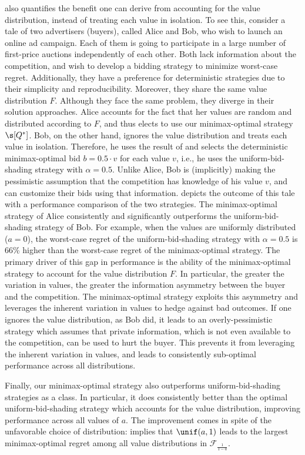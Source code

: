  also quantifies the benefit one can derive from accounting for the value distribution, instead of treating each value in isolation. To see this, consider a tale of two advertisers (buyers), called Alice and Bob, who wish to launch an online ad campaign. Each of them is going to participate in a large number of first-price auctions independently of each other. Both lack information about the competition, and wish to develop a bidding strategy to minimize worst-case regret. Additionally, they have a preference for deterministic strategies due to their simplicity and reproducibility. Moreover, they share the same value distribution $F$. Although they face the same problem, they diverge in their solution approaches. Alice accounts for the fact that her values are random and distributed according to $F$, and thus elects to use our minimax-optimal strategy $\s[Q^*]$. Bob, on the other hand, ignores the value distribution and treats each value in isolation. Therefore, he uses the result of \citet{kasberger2023robust} and selects the deterministic minimax-optimal bid $b = 0.5 \cdot v$ for each value $v$, i.e., he uses the uniform-bid-shading strategy with $\alpha = 0.5$. Unlike Alice, Bob is (implicitly) making the pessimistic assumption that the competition has knowledge of his value $v$, and can customize their bids using that information.  depicts the outcome of this tale with a performance comparison of the two strategies. The minimax-optimal strategy of Alice consistently and significantly outperforms the uniform-bid-shading strategy of Bob. For example, when the values are uniformly distributed ($a = 0$), the worst-case regret of the uniform-bid-shading strategy with $\alpha = 0.5$ is 66\% higher than the worst-case regret of the minimax-optimal strategy. The primary driver of this gap in performance is the ability of the minimax-optimal strategy to account for the value distribution $F$. In particular, the greater the variation in values, the greater the information asymmetry between the buyer and the competition. The minimax-optimal strategy exploits this asymmetry and leverages the inherent variation in values to hedge against bad outcomes. If one ignores the value distribution, as Bob did, it leads to an overly-pessimistic strategy which assumes that private information, which is not even available to the competition, can be used to hurt the buyer. This prevents it from leveraging the inherent variation in values, and leads to consistently sub-optimal performance across all distributions.

Finally, our minimax-optimal strategy also outperforms uniform-bid-shading strategies as a class. In particular, it does consistently better than the optimal uniform-bid-shading strategy which accounts for the value distribution, improving performance across all values of $a$. The improvement comes in spite of the unfavorable choice of distribution:  implies that $\unif(a,1)$ leads to the largest minimax-optimal regret among all value distributions in $\mathcal{F}_{\frac{1}{1-a}}$. 


